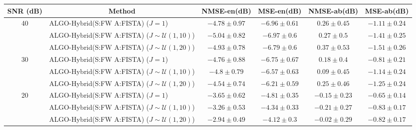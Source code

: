 \begin{table}[h]
\centering
\begin{adjustbox}{max width=\textwidth}
\begin{tabular}{|c|l|c|c|c|c|}
\hline
SNR (dB)            & \multicolumn{1}{c|}{Method}                           & NMSE-en(dB)         & MSE-en(dB)          & NMSE-ab(dB)         & MSE-ab(dB)          \tabularnewline \hline
\multirow{3}{*}{40} & ALGO-Hybrid(S:FW A:FISTA) ($J=1$)                     & $-4.78    \pm 0.97$ & $-6.96    \pm 0.61$ & $0.26     \pm 0.45$ & $-1.11    \pm 0.24$ \tabularnewline
                    & ALGO-Hybrid(S:FW A:FISTA) ($J\sim\mathcal{U}(1,10)$)  & $-5.04    \pm 0.82$ & $-6.97    \pm 0.6$  & $0.27     \pm 0.5$  & $-1.41    \pm 0.25$ \tabularnewline
                    & ALGO-Hybrid(S:FW A:FISTA) ($J\sim\mathcal{U}(1,20)$)  & $-4.93    \pm 0.78$ & $-6.79    \pm 0.6$  & $0.37     \pm 0.53$ & $-1.51    \pm 0.26$ \tabularnewline \hline
\multirow{3}{*}{30} & ALGO-Hybrid(S:FW A:FISTA) ($J=1$)                     & $-4.76    \pm 0.88$ & $-6.75    \pm 0.67$ & $0.18     \pm 0.4$  & $-0.81    \pm 0.21$ \tabularnewline
                    & ALGO-Hybrid(S:FW A:FISTA) ($J\sim\mathcal{U}(1,10)$)  & $-4.8     \pm 0.79$ & $-6.57    \pm 0.63$ & $0.09     \pm 0.45$ & $-1.14    \pm 0.24$ \tabularnewline
                    & ALGO-Hybrid(S:FW A:FISTA) ($J\sim\mathcal{U}(1,20)$)  & $-4.54    \pm 0.74$ & $-6.21    \pm 0.59$ & $0.25     \pm 0.46$ & $-1.25    \pm 0.24$ \tabularnewline \hline
\multirow{3}{*}{20} & ALGO-Hybrid(S:FW A:FISTA) ($J=1$)                     & $-3.65    \pm 0.62$ & $-4.81    \pm 0.35$ & $-0.15    \pm 0.23$ & $-0.65    \pm 0.14$ \tabularnewline
                    & ALGO-Hybrid(S:FW A:FISTA) ($J\sim\mathcal{U}(1,10)$)  & $-3.26    \pm 0.53$ & $-4.34    \pm 0.33$ & $-0.21    \pm 0.27$ & $-0.83    \pm 0.17$ \tabularnewline
                    & ALGO-Hybrid(S:FW A:FISTA) ($J\sim\mathcal{U}(1,20)$)  & $-2.94    \pm 0.49$ & $-4.12    \pm 0.3$  & $-0.02    \pm 0.29$ & $-0.82    \pm 0.17$ \tabularnewline \hline

\end{tabular}
\end{adjustbox}
\end{table}
